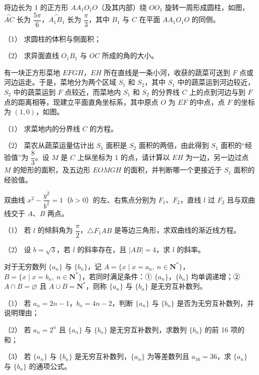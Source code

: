 \Needspace{0.4\textheight}
\begin{question}
将边长为 1 的正方形 \(AA_1O_1O\)（及其内部）绕 \(OO_1\) 旋转一周形成圆柱，如图，\(\overset{\frown}{AC}\) 长为 \(\dfrac{5\pi}6\)，\(\overset{\frown}{A_1B_1}\) 长为 \(\dfrac\pi3\)，其中 \(B_1\) 与 \(C\) 在平面 \(AA_1O_1O\) 的同侧。

（1） 求圆柱的体积与侧面积；

（2） 求异面直线 \(O_1B_1\) 与 \(OC\) 所成的角的大小。
\nopagebreak[4]
\begin{center}\end{center}
\nopagebreak[4]
\Needspace{0.4\textheight}
\end{question}
\begin{question}
有一块正方形菜地 \(EFGH\)，\(EH\) 所在直线是一条小河，收获的蔬菜可送到 \(F\) 点或河边运走。于是，菜地分为两个区域 \(S_1\) 和 \(S_2\)，其中 \(S_1\) 中的蔬菜运到河边较近，\(S_2\) 中的蔬菜运到 \(F\) 点较近，而菜地内 \(S_1\) 和 \(S_2\) 的分界线 \(C\) 上的点到河边与到 \(F\) 点的距离相等，现建立平面直角坐标系，其中原点 \(O\) 为 \(EF\) 的中点，点 \(F\) 的坐标为 \((1,0)\)，如图。

（1） 求菜地内的分界线 \(C\) 的方程。

（2） 菜农从蔬菜运量估计出 \(S_1\) 面积是 \(S_2\) 面积的两倍，由此得到 \(S_1\) 面积的“经验值”为 \(\dfrac83\)。设 \(M\) 是 \(C\) 上纵坐标为 1 的点，请计算以 \(EH\) 为一边，另一边过点 \(M\) 的矩形的面积，及五边形 \(EOMGH\) 的面积，并判断哪一个更接近于 \(S_1\) 面积的经验值。
\nopagebreak[4]
\begin{center}\end{center}
\nopagebreak[4]
\end{question}
\begin{question}
双曲线 \(x^2-\dfrac{y^2}{b^2}=1\)（\(b>0\)）的左、右焦点分别为 \(F_1\)、\(F_2\)，直线 \(l\) 过 \(F_2\) 且与双曲线交于 \(A\)、\(B\) 两点。

（1） 若 \(l\) 的倾斜角为 \(\dfrac\pi2\)，\(\triangle F_1AB\) 是等边三角形，求双曲线的渐近线方程。

（2） 设 \(b=\sqrt3\)，若 \(l\) 的斜率存在，且 \(|AB|=4\)，求 \(l\) 的斜率。


\end{question}
\begin{question}
对于无穷数列 \(\{a_n\}\) 与 \(\{b_n\}\)，记 \(A=\{x\mid x=a_n,\ n\in\mathbf N^*\}\)，\(B=\{x\mid x=b_n,\ n\in\mathbf N^*\}\)，若同时满足条件：① \(\{a_n\}\)，\(\{b_n\}\) 均单调递增；② \(A\cap B=\varnothing\) 且 \(A\cup B=\mathbf N^*\)，则称 \(\{a_n\}\) 与 \(\{b_n\}\) 是无穷互补数列。

（1） 若 \(a_n=2n-1\)，\(b_n=4n-2\)，判断 \(\{a_n\}\) 与 \(\{b_n\}\) 是否为无穷互补数列，并说明理由；

（2） 若 \(a_n=2^n\) 且 \(\{a_n\}\) 与 \(\{b_n\}\) 是无穷互补数列，求数列 \(\{b_n\}\) 的前 16 项的和；

（3） 若 \(\{a_n\}\) 与 \(\{b_n\}\) 是无穷互补数列，\(\{a_n\}\) 为等差数列且 \(a_{16}=36\)，求 \(\{a_n\}\) 与 \(\{b_n\}\) 的通项公式。

\end{question}
